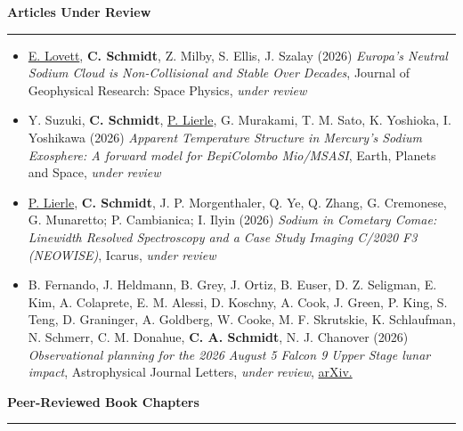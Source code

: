 \documentclass[12pt]{report}
\begin{document}
\vspace{2 mm}
\noindent\textbf{Articles Under Review} \rm\hspace*{\fill} \\
\rule{\textwidth}{1pt}
\begin{itemize} \itemsep -2pt %
  \item \underline{E. Lovett}, \textbf{C. Schmidt}, Z. Milby, S. Ellis, J. Szalay (2026) \textit{Europa's Neutral Sodium Cloud is Non-Collisional and Stable Over Decades}, Journal of Geophysical Research: Space Physics, \textit{under review} 
  \item Y. Suzuki, \textbf{C. Schmidt}, \underline{P. Lierle}, G. Murakami, T. M. Sato, K. Yoshioka, I. Yoshikawa (2026) \textit{Apparent Temperature Structure in Mercury's Sodium Exosphere: A forward model for BepiColombo Mio/MSASI}, Earth, Planets and Space, \textit{under review} 
  \item \underline{P. Lierle}, \textbf{C. Schmidt}, J. P. Morgenthaler, Q. Ye, Q. Zhang, G. Cremonese, G. Munaretto; P. Cambianica; I. Ilyin (2026) \textit{Sodium in Cometary Comae: Linewidth Resolved Spectroscopy and a Case Study Imaging C/2020 F3 (NEOWISE)}, Icarus, \textit{under review}  
  \item B. Fernando, J. Heldmann, B. Grey, J. Ortiz, B. Euser, D. Z. Seligman, E. Kim, A. Colaprete, E. M. Alessi, D. Koschny, A. Cook, J. Green, P. King, S. Teng, D. Graninger, A. Goldberg, W. Cooke, M. F. Skrutskie, K. Schlaufman, N. Schmerr, C. M. Donahue, \textbf{C. A. Schmidt}, N. J. Chanover (2026) \textit{Observational planning for the 2026 August 5 Falcon 9 Upper Stage lunar impact}, Astrophysical Journal Letters, \textit{under review}, \href{https://doi.org/10.48550/arXiv.2607.14625}{arXiv.}
 \end{itemize}
\vspace{2 mm}
\noindent\textbf{Peer-Reviewed Book Chapters} \rm\hspace*{\fill} \\
\rule{\textwidth}{1pt}
\end{document}
